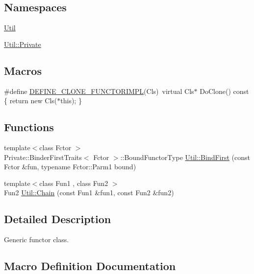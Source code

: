 \subsection*{Namespaces}
\begin{DoxyCompactItemize}
\item 
 \mbox{\hyperlink{namespaceUtil}{Util}}
\item 
 \mbox{\hyperlink{namespaceUtil_1_1Private}{Util\+::\+Private}}
\end{DoxyCompactItemize}
\subsection*{Macros}
\begin{DoxyCompactItemize}
\item 
\#define \mbox{\hyperlink{adat-devel_2lib_2adat_2objfunctor_8h_a1ce0594c43b9f88c56fa0ee4a2b31e03}{D\+E\+F\+I\+N\+E\+\_\+\+C\+L\+O\+N\+E\+\_\+\+F\+U\+N\+C\+T\+O\+R\+I\+M\+PL}}(Cls)~virtual Cls$\ast$ Do\+Clone() const \{ return new Cls($\ast$this); \}
\end{DoxyCompactItemize}
\subsection*{Functions}
\begin{DoxyCompactItemize}
\item 
{\footnotesize template$<$class Fctor $>$ }\\Private\+::\+Binder\+First\+Traits$<$ Fctor $>$\+::Bound\+Functor\+Type \mbox{\hyperlink{namespaceUtil_a45c72128892bb56a451a2e5300140d16}{Util\+::\+Bind\+First}} (const Fctor \&fun, typename Fctor\+::\+Parm1 bound)
\item 
{\footnotesize template$<$class Fun1 , class Fun2 $>$ }\\Fun2 \mbox{\hyperlink{namespaceUtil_aec917a0595af831ead52c7ebaba3b708}{Util\+::\+Chain}} (const Fun1 \&fun1, const Fun2 \&fun2)
\end{DoxyCompactItemize}


\subsection{Detailed Description}
Generic functor class. 



\subsection{Macro Definition Documentation}
\mbox{\label{adat-devel_2lib_2adat_2objfunctor_8h_a1ce0594c43b9f88c56fa0ee4a2b31e03}} 
